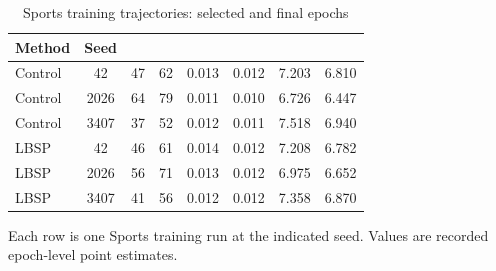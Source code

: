 \begin{table}[!htbp]
\centering
\caption{Sports training trajectories: selected and final epochs}
\label{tab:x7-training}
\fontsize{8.5}{11}\selectfont
\setlength{\tabcolsep}{1.6pt}
\renewcommand{\arraystretch}{1.15}
\begin{tabular*}{\textwidth}{@{\extracolsep{\fill}}lS[table-format=4.0,group-digits=false]S[table-format=2.0]S[table-format=2.0]S[table-format=1.3]S[table-format=1.3]S[table-format=1.3]S[table-format=1.3]@{}}
\toprule
Method & {Seed} & {} & {} & {} & {} & {} & {}\\
\midrule
Control & 42 & 47 & 62 & 0.013 & 0.012 & 7.203 & 6.810\\ %
Control & 2026 & 64 & 79 & 0.011 & 0.010 & 6.726 & 6.447\\ %
Control & 3407 & 37 & 52 & 0.012 & 0.011 & 7.518 & 6.940\\ %
\midrule
LBSP & 42 & 46 & 61 & 0.014 & 0.012 & 7.208 & 6.782\\ %
LBSP & 2026 & 56 & 71 & 0.013 & 0.012 & 6.975 & 6.652\\ %
LBSP & 3407 & 41 & 56 & 0.012 & 0.012 & 7.358 & 6.870\\ %
\bottomrule
\end{tabular*}
\par\smallskip\noindent\begin{minipage}{\textwidth}\fontsize{8.5}{11}\selectfont Each row is one Sports training run at the indicated seed. Values are recorded epoch-level point estimates.
\end{minipage}
\end{table}
